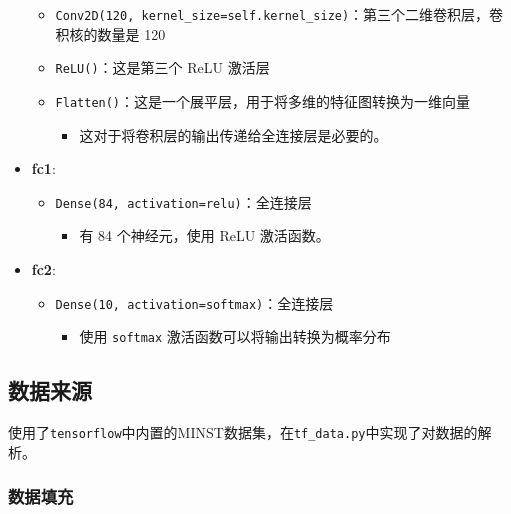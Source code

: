 \documentclass[12pt,a4paper]{article}
\begin{document}
\begin{itemize}
  \begin{itemize}
  \item
    \texttt{Conv2D(120,\ kernel\_size=self.kernel\_size)}：第三个二维卷积层，卷积核的数量是
    120
  \item
    \texttt{ReLU()}：这是第三个 ReLU 激活层
  \item
    \texttt{Flatten()}：这是一个展平层，用于将多维的特征图转换为一维向量

    \begin{itemize}
    \item
      这对于将卷积层的输出传递给全连接层是必要的。
    \end{itemize}
  \end{itemize}
\item
  \textbf{fc1}:

  \begin{itemize}
  \item
    \texttt{Dense(84,\ activation=\textquotesingle{}relu\textquotesingle{})}：全连接层

    \begin{itemize}
    \item
      有 84 个神经元，使用 ReLU 激活函数。
    \end{itemize}
  \end{itemize}
\item
  \textbf{fc2}:

  \begin{itemize}
  \item
    \texttt{Dense(10,\ activation=\textquotesingle{}softmax\textquotesingle{})}：全连接层

    \begin{itemize}
    \item
      使用 \texttt{softmax} 激活函数可以将输出转换为概率分布
    \end{itemize}
  \end{itemize}
\end{itemize}

\subsection{数据来源}

使用了\texttt{tensorflow}中内置的MINST数据集，在\texttt{tf\_data.py}中实现了对数据的解析。

\subsubsection{数据填充}
\end{document}

